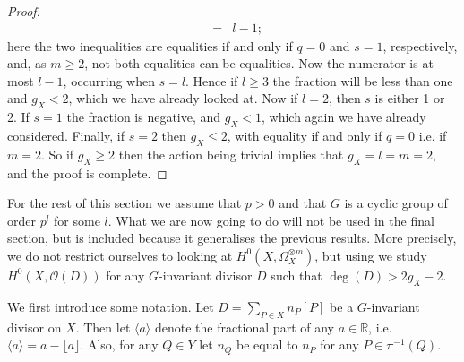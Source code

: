 \documentclass[11pt]{article} %
\theoremstyle{remark}\newtheorem*{rem}{Remark}
\begin{document}
\begin{proof}
\begin{eqnarray*}
	& = & l-1;
      \end{eqnarray*}
    here the two inequalities are equalities if and only if $q=0$ and $s=1$, respectively, and, as $m\geq 2$, not both equalities can be equalities.
    Now the numerator is at most $l-1$, occurring when $s=l$. 
    Hence if $l\geq 3$ the fraction will be less than one and $g_X < 2$, which we have already looked at.
    Now if $l=2$, then $s$ is either 1 or 2.
    If $s=1$ the fraction is negative, and $g_X<1$, which again we have already considered.
    Finally, if $s=2$ then $g_X\leq 2$, with equality if and only if $q=0$ i.e. if $m=2$.
    So if $g_X \geq 2$ then the action being trivial implies that $g_X=l=m=2$, and the proof is complete.    
  \end{proof}

For the rest of this section we assume that $p>0$ and that $G$ is a cyclic group of order $p^l$ for some $l$.
What we are now going to do will not be used in the final section, but is included because it generalises the previous results.
More precisely, we do not restrict ourselves to looking at $H^0(X,\Omega_X^{\otimes m})$, but using \cite{kako} we study $H^0(X,\mathscr{O}(D))$ for any $G$-invariant divisor $D$ such that $\deg(D)>2g_X-2$.


We first introduce some notation.
Let $D = \sum_{P\in X} n_P[P]$ be a $G$-invariant divisor on $X$.
Then let $\langle a \rangle$ denote the fractional part of any $a\in \mathbb{R}$, i.e. $\langle a \rangle = a - \lfloor a \rfloor$.
Also, for any $Q\in Y$ let $n_Q$ be equal to $n_P$ for any $P\in \pi^{-1}(Q)$.\\
\end{document}
